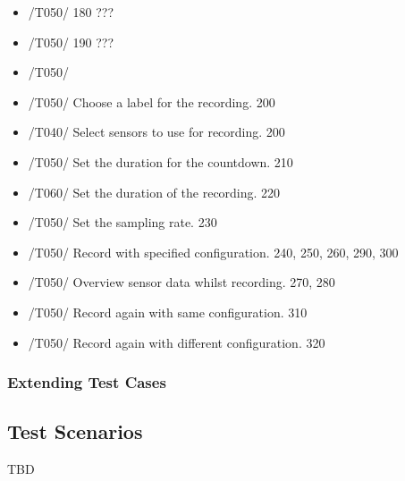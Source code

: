 \begin{itemize}
    \item /T050/ 180 ???
    \item /T050/ 190 ???
    \item /T050/ 
    \item /T050/ Choose a label for the recording. 200
    \item /T040/ Select sensors to use for recording. 200
    \item /T050/ Set the duration for the countdown. 210
    \item /T060/ Set the duration of the recording. 220
    \item /T050/ Set the sampling rate. 230
    \item /T050/ Record with specified configuration. 240, 250, 260, 290, 300
    \item /T050/ Overview sensor data whilst recording. 270, 280
    \item /T050/ Record again with same configuration. 310
    \item /T050/ Record again with different configuration. 320
\end{itemize}
\subsubsection{Extending Test Cases}
\subsection{Test Scenarios}
TBD